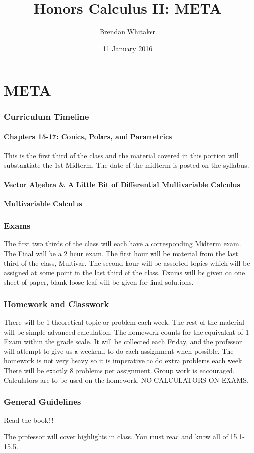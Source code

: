 \documentclass[12pt]{article}
\title{Honors Calculus II: META}
\author{Brendan Whitaker}
\date{11 January 2016}
\begin{document}
\maketitle

\part{META}
\section{Curriculum Timeline}
\subsection{Chapters 15-17: Conics, Polars, and Parametrics}
This is the first third of the class and the material covered in this portion will substantiate the 1st Midterm. The date of the midterm is posted on the syllabus. 
\subsection{Vector Algebra \& A Little Bit of Differential Multivariable Calculus}
\subsection{Multivariable Calculus}
\section{Exams}
The first two thirds of the class will each have a corresponding Midterm exam. The Final will be a 2 hour exam. The first hour will be material from the last third of the class, Multivar. The second hour will be assorted topics which will be assigned at some point in the last third of the class. Exams will be given on one sheet of paper, blank loose leaf will be given for final solutions. 


\section{Homework and Classwork}
There will be 1 theoretical topic or problem each week. The rest of the material will be simple advanced calculation. The homework counts for the equivalent of 1 Exam within the grade scale. It will be collected each Friday, and the professor will attempt to give us a weekend to do each assignment when possible. The homework is not very heavy so it is imperative to do extra problems each week. There will be exactly 8 problems per assignment. Group work is encouraged. Calculators are to be used on the homework. NO CALCULATORS ON EXAMS. 
\section{General Guidelines}
Read the book!!!

The professor will cover highlights in class. You must read and know all of 15.1-15.5. 




 
\end{document}
